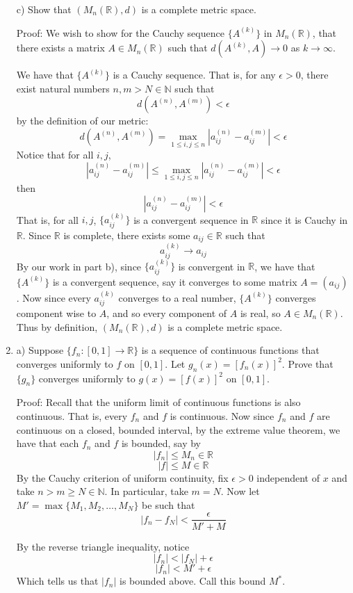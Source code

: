 \documentclass{article}
\begin{document}
\begin{enumerate}
    
    c) Show that $(M_n(\mathbb{R}), d)$ is a complete metric space.
    
    Proof: We wish to show for the Cauchy sequence $\{A^{(k)}\}$ in $M_n(\mathbb{R})$, that there exists a matrix $A \in M_n(\mathbb{R})$ such that $d(A^{(k)},A) \to 0$ as $k \to \infty$. 
    
    We have that $\{A^{(k)}\}$ is a Cauchy sequence. That is, for any $\epsilon > 0$, there exist natural numbers $n,m > N \in \mathbb{N}$ such that 
    \[d(A^{(n)}, A^{(m)}) < \epsilon\]
    by the definition of our metric:
    \[d(A^{(n)}, A^{(m)}) = \max_{1 \leq i,j \leq n}|a_{ij}^{(n)} - a_{ij}^{(m)}| < \epsilon\]
    Notice that for all $i,j$,
    \[|a_{ij}^{(n)} - a_{ij}^{(m)}| \leq \max_{1 \leq i,j \leq n}|a_{ij}^{(n)} - a_{ij}^{(m)}| < \epsilon\]
    then
    \[|a_{ij}^{(n)} - a_{ij}^{(m)}| < \epsilon\]
    That is, for all $i,j$, $\{a_{ij}^{(k)}\}$ is a convergent sequence in $\mathbb{R}$ since it is Cauchy in $\mathbb{R}$. Since $\mathbb{R}$ is complete, there exists some $a_{ij} \in \mathbb{R}$ such that 
    \[a_{ij}^{(k)} \to a_{ij}\]
    By our work in part b), since $\{a_{ij}^{(k)}\}$ is convergent in $\mathbb{R}$, we have that $\{A^{(k)}\}$ is a convergent sequence, say it converges to some matrix $A = (a_{ij})$. Now since every $a_{ij}^{(k)}$ converges to a real number, $\{A^{(k)}\}$ converges component wise to $A$, and so every component of $A$ is real, so $A \in M_n(\mathbb{R})$. Thus by definition, $(M_n(\mathbb{R}), d)$ is a complete metric space.
    
    
    \item a) Suppose $\{f_n : [0,1] \to \mathbb{R}\}$ is a sequence of continuous functions that converges uniformly to $f$ on $[0,1]$. Let $g_n(x) = [f_n(x)]^2$. Prove that $\{g_n\}$ converges uniformly to $g(x) = [f(x)]^2$ on $ [0,1]$.
    
    Proof: Recall that the uniform limit of continuous functions is also continuous. That is, every $f_n$ and $f$ is continuous. Now since $f_n$ and $f$ are continuous on a closed, bounded interval, by the extreme value theorem, we have that each $f_n$ and $f$ is bounded, say by
    \[|f_n| \leq M_n \in \mathbb{R}\]
    \[|f| \leq M \in \mathbb{R}\]
    By the Cauchy criterion of uniform continuity, fix $\epsilon > 0$ independent of $x$ and take $n > m \geq N \in \mathbb{N}$. In particular, take $m = N$. 
    Now let $M' = \max\{M_1, M_2, \ldots, M_N\}$ be such that
    \[|f_n - f_N| < \frac{\epsilon}{M' + M}\]
    
    By the reverse triangle inequality, notice
    \[|f_n| < |f_N| + \epsilon\]
    \[|f_n| < M' + \epsilon\]
    Which tells us that $|f_n|$ is bounded above. Call this bound $M^*$.
    

\end{enumerate}
\end{document}
